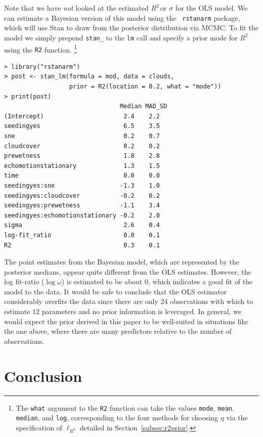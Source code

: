 \documentclass[11pt]{article}
\newcommand{\Rsq}{$R^2\,$}
\newcommand{\locRsq}{\ell_{R^2}}
\begin{document}
Note that we have \emph{not} looked at the estimated \Rsq or $\sigma$ for the
OLS model. We can estimate a Bayesian version of this model using the {\tt
rstanarm} package, which will use Stan \cite{stan} to draw from the posterior
distribution via MCMC. To fit the model we simply prepend {\tt stan\_} to the
{\tt lm} call and specify a prior mode for \Rsq using the {\tt R2} function.%
\footnote{The {\tt what} argument to the {\tt R2} function can take the values
{\tt mode}, {\tt mean}, {\tt median}, and {\tt log}, corresponding to the four
methods for choosing $\eta$ via the specification of $\locRsq$ detailed in
Section~\ref{subsec:r2prior}.}

\vspace{.5cm}
\begin{lstlisting}[frame=lines]
> library("rstanarm")
> post <- stan_lm(formula = mod, data = clouds,
                  prior = R2(location = 0.2, what = "mode"))
> print(post)
                                Median MAD_SD
(Intercept)                      2.4    2.2
seedingyes                       6.5    3.5
sne                              0.2    0.7
cloudcover                       0.2    0.2
prewetness                       1.8    2.8
echomotionstationary             1.3    1.5
time                             0.0    0.0
seedingyes:sne                  -1.3    1.0
seedingyes:cloudcover           -0.2    0.2
seedingyes:prewetness           -1.1    3.4
seedingyes:echomotionstationary -0.2    2.0
sigma                            2.6    0.4
log-fit_ratio                    0.0    0.1
R2                               0.3    0.1
\end{lstlisting}
\vspace{.5cm}

The point estimates from the Bayesian model, which are represented by the
posterior medians, appear quite different from the OLS estimates. However, the
log fit-ratio ($\log{\omega}$) is estimated to be about $0$, which indicates a
good fit of the model to the data. It would be safe to conclude that the OLS
estimator considerably overfits the data since there are only $24$ observations
with which to estimate $12$ parameters and no prior information is leveraged. In
general, we would expect the prior derived in this paper to be well-suited in
situations like the one above, where there are many predictors relative to the
number of observations.


\section{Conclusion}
\end{document}
